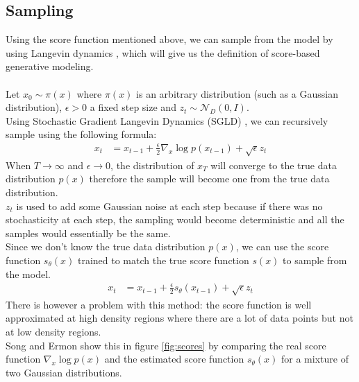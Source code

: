 \documentclass[twoside]{article}
\numberwithin{equation}{section}
\numberwithin{figure}{section}
\begin{document}
\subsection{Sampling}
Using the score function mentioned above, we can sample from the model by using Langevin dynamics \cite{song2020generative, WelTeh2011a}, which will give us the definition of score-based generative modeling. \cite{song2020generative}
\\\\
Let $x_0 \sim \pi (x)$ where $\pi (x)$ is an arbitrary distribution (such as a Gaussian distribution), $\epsilon > 0$ a fixed step size and $z_t \sim \mathcal{N}_D (0, I)$. \\
Using Stochastic Gradient Langevin Dynamics (SGLD) \cite{song2020generative, WelTeh2011a}, we can recursively sample using the following formula:
\begin{align}
  x_t &= x_{t-1} + \frac{\epsilon}{2} \nabla_x \log p(x_{t-1}) + \sqrt{\epsilon} z_t
\end{align}
When $T \rightarrow \infty$ and $\epsilon \rightarrow 0$, the distribution of $x_T$ will converge to the true data distribution $p(x)$ therefore the sample will become one from the true data distribution. \cite{song2020generative,WelTeh2011a} \\
$z_t$ is used to add some Gaussian noise at each step because if there was no stochasticity at each step, the sampling would become deterministic and all the samples would essentially be the same.\\
Since we don't know the true data distribution $p(x)$, we can use the score function $s_\theta (x)$ trained to match the true score function $s(x)$ to sample from the model. \\
\begin{align}
  x_t &= x_{t-1} + \frac{\epsilon}{2} s_\theta (x_{t-1}) + \sqrt{\epsilon} z_t
\end{align}
There is however a problem with this method: the score function is well approximated at high density regions where there are a lot of data points but not at low density regions. \cite{song2020generative} \\
Song and Ermon \cite{song2020generative} show this in figure \ref{fig:scores} by comparing the real score function $\nabla_x \log p(x)$ and the estimated score function $s_\theta (x)$ for a mixture of two Gaussian distributions.
\end{document}

